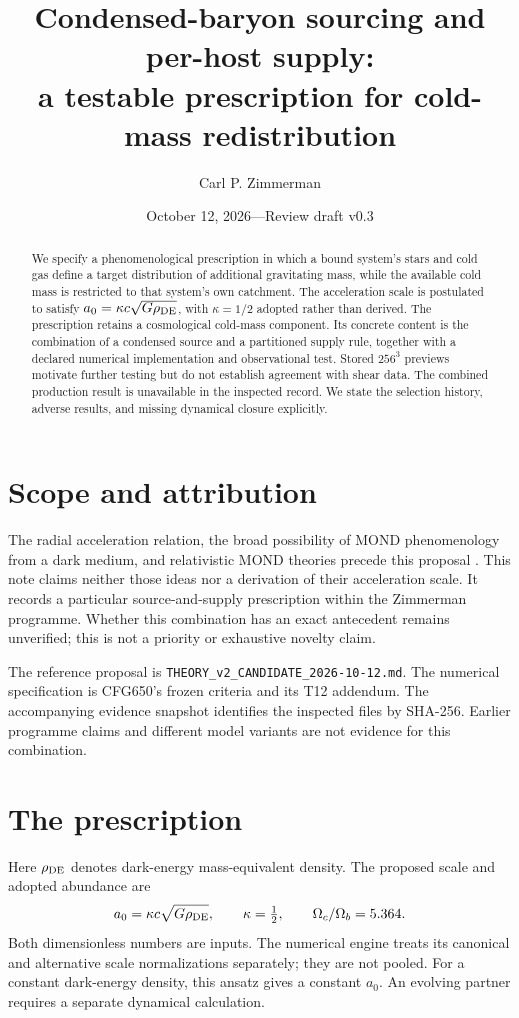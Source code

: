 \documentclass[11pt]{article}
\title{Condensed-baryon sourcing and per-host supply:\\a testable prescription for cold-mass redistribution}
\author{Carl P. Zimmerman}
\date{October 12, 2026\quad---\quad Review draft v0.3}
\begin{document}
\maketitle
\begin{abstract}
We specify a phenomenological prescription in which a bound system's stars and cold gas define a target distribution of additional gravitating mass, while the available cold mass is restricted to that system's own catchment. The acceleration scale is postulated to satisfy $a_0=\kappa c\sqrt{G\rho_{\rm DE}}$, with $\kappa=1/2$ adopted rather than derived. The prescription retains a cosmological cold-mass component. Its concrete content is the combination of a condensed source and a partitioned supply rule, together with a declared numerical implementation and observational test. Stored $256^3$ previews motivate further testing but do not establish agreement with shear data. The combined production result is unavailable in the inspected record. We state the selection history, adverse results, and missing dynamical closure explicitly.
\end{abstract}

\section{Scope and attribution}
The radial acceleration relation, the broad possibility of MOND phenomenology from a dark medium, and relativistic MOND theories precede this proposal \cite{rar,dipole,aest}. This note claims neither those ideas nor a derivation of their acceleration scale. It records a particular source-and-supply prescription within the Zimmerman programme. Whether this combination has an exact antecedent remains unverified; this is not a priority or exhaustive novelty claim.

The reference proposal is \texttt{THEORY\_v2\_CANDIDATE\_2026-10-12.md}. The numerical specification is CFG650's frozen criteria and its T12 addendum. The accompanying evidence snapshot identifies the inspected files by SHA-256. Earlier programme claims and different model variants are not evidence for this combination.

\section{The prescription}
Here $\rho_{\rm DE}$ denotes dark-energy mass-equivalent density. The proposed scale and adopted abundance are
\begin{equation}
 a_0=\kappa c\sqrt{G\rho_{\rm DE}},\qquad
 \kappa=\tfrac12,\qquad \Omega_c/\Omega_b=5.364.
\end{equation}
Both dimensionless numbers are inputs. The numerical engine treats its canonical and alternative scale normalizations separately; they are not pooled. For a constant dark-energy density, this ansatz gives a constant $a_0$. An evolving partner requires a separate dynamical calculation.
\end{document}
